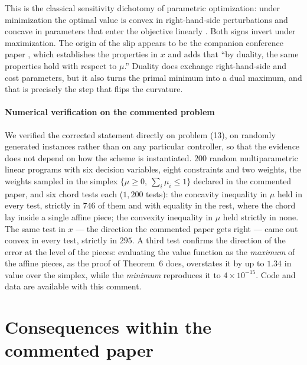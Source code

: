 \documentclass[review]{elsarticle}
\begin{document}
This is the classical sensitivity dichotomy of parametric optimization: under
minimization the optimal value is convex in right-hand-side perturbations and
concave in parameters that enter the objective linearly
\citep[Sec.~5.6.1, Ex.~3.9]{boyd2004}. Both signs invert under maximization.
The origin of the slip appears to be the companion conference paper
\citep[p.~2406]{bemporad2009ecc}, which establishes the properties in $x$ and
adds that ``by duality, the same properties hold with respect to $\mu$.''
Duality does exchange right-hand-side and cost parameters, but it also turns
the primal minimum into a dual maximum, and that is precisely the step that
flips the curvature.

\paragraph{Numerical verification on the commented problem}
We verified the corrected statement directly on problem (13), on randomly
generated instances rather than on any particular controller, so that the
evidence does not depend on how the scheme is instantiated. $200$ random
multiparametric linear programs with six decision variables, eight
constraints and two weights, the weights sampled in the simplex
$\{\mu\ge0,\ \sum_i\mu_i\le1\}$ declared in the commented paper, and six chord
tests each ($1{,}200$ tests): the concavity inequality in $\mu$ held in every
test, strictly in $746$ of them and with equality in the rest, where the chord
lay inside a single affine piece; the convexity inequality in $\mu$ held
strictly in none. The same test in $x$ --- the direction the commented paper
gets right --- came out convex in every test, strictly in $295$. A third test
confirms the direction of the error at the level of the pieces: evaluating the
value function as the \emph{maximum} of the affine pieces, as the proof of
Theorem~6 does, overstates it by up to $1.34$ in value over the simplex, while
the \emph{minimum} reproduces it to $4\times10^{-15}$. Code and data are available with this comment.

\section{Consequences within the commented paper}
\end{document}

